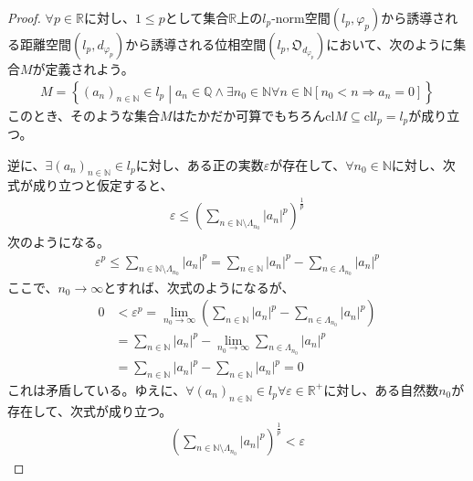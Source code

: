\documentclass[dvipdfmx]{jsarticle}
\begin{document}
\begin{proof}
$\forall p \in \mathbb{R}$に対し、$1 \leq p$として集合$\mathbb{R}$上の$l_{p}$-norm空間$\left( l_{p},\varphi_{p} \right)$から誘導される距離空間$\left( l_{p},d_{\varphi_{p}} \right)$から誘導される位相空間$\left( l_{p},\mathfrak{O}_{d_{\varphi_{p}}} \right)$において、次のように集合$M$が定義されよう。
\begin{align*}
M = \left\{ \left( a_{n} \right)_{n \in \mathbb{N}} \in l_{p} \middle| a_{n} \in \mathbb{Q} \land \exists n_{0} \in \mathbb{N}\forall n \in \mathbb{N}\left[ n_{0} < n \Rightarrow a_{n} = 0 \right] \right\}
\end{align*}
このとき、そのような集合$M$はたかだか可算でもちろん${\mathrm{cl}}M \subseteq {\mathrm{cl}}l_{p} = l_{p}$が成り立つ。\par
逆に、$\exists\left( a_{n} \right)_{n \in \mathbb{N}} \in l_{p}$に対し、ある正の実数$\varepsilon$が存在して、$\forall n_{0} \in \mathbb{N}$に対し、次式が成り立つと仮定すると、
\begin{align*}
\varepsilon \leq \left( \sum_{n \in \mathbb{N} \setminus \varLambda_{n_{0}}} \left| a_{n} \right|^{p} \right)^{\frac{1}{p}}
\end{align*}
次のようになる。
\begin{align*}
\varepsilon^{p} \leq \sum_{n \in \mathbb{N} \setminus \varLambda_{n_{0}}} \left| a_{n} \right|^{p} = \sum_{n \in \mathbb{N}} \left| a_{n} \right|^{p} - \sum_{n \in \varLambda_{n_{0}}} \left| a_{n} \right|^{p}
\end{align*}
ここで、$n_{0} \rightarrow \infty$とすれば、次式のようになるが、
\begin{align*}
0 &< \varepsilon^{p} = \lim_{n_{0} \rightarrow \infty}\left( \sum_{n \in \mathbb{N}} \left| a_{n} \right|^{p} - \sum_{n \in \varLambda_{n_{0}}} \left| a_{n} \right|^{p} \right)\\
&= \sum_{n \in \mathbb{N}} \left| a_{n} \right|^{p} - \lim_{n_{0} \rightarrow \infty}{\sum_{n \in \varLambda_{n_{0}}} \left| a_{n} \right|^{p}}\\
&= \sum_{n \in \mathbb{N}} \left| a_{n} \right|^{p} - \sum_{n \in \mathbb{N}} \left| a_{n} \right|^{p} = 0
\end{align*}
これは矛盾している。ゆえに、$\forall\left( a_{n} \right)_{n \in \mathbb{N}} \in l_{p}\forall\varepsilon \in \mathbb{R}^{+}$に対し、ある自然数$n_{0}$が存在して、次式が成り立つ。
\begin{align*}
\left( \sum_{n \in \mathbb{N} \setminus \varLambda_{n_{0}}} \left| a_{n} \right|^{p} \right)^{\frac{1}{p}} < \varepsilon

\end{align*}
\end{proof}
\end{document}
